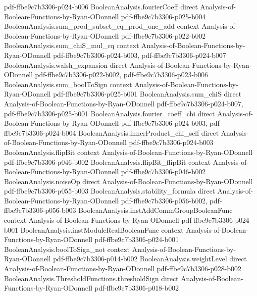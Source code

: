 \begin{lemma}
{    pdf-ffbe9c7b3306-p024-b006}
\proofstep
  {BooleanAnalysis.fourierCoeff}
  {direct}
  {Analysis-of-Boolean-Functions-by-Ryan-ODonnell}
  {pdf-ffbe9c7b3306-p025-b004}
\proofstep
  {BooleanAnalysis.sum_prod_subset_eq_prod_one_add}
  {context}
  {Analysis-of-Boolean-Functions-by-Ryan-ODonnell}
  {pdf-ffbe9c7b3306-p022-b002}
\proofstep
  {BooleanAnalysis.sum_chiS_mul_eq}
  {context}
  {Analysis-of-Boolean-Functions-by-Ryan-ODonnell}
  {pdf-ffbe9c7b3306-p024-b003,
    pdf-ffbe9c7b3306-p024-b007}
\proofstep
  {BooleanAnalysis.walsh_expansion}
  {direct}
  {Analysis-of-Boolean-Functions-by-Ryan-ODonnell}
  {pdf-ffbe9c7b3306-p022-b002,
    pdf-ffbe9c7b3306-p023-b006}
\proofstep
  {BooleanAnalysis.sum_boolToSign}
  {context}
  {Analysis-of-Boolean-Functions-by-Ryan-ODonnell}
  {pdf-ffbe9c7b3306-p025-b001}
\proofstep
  {BooleanAnalysis.sum_chiS}
  {direct}
  {Analysis-of-Boolean-Functions-by-Ryan-ODonnell}
  {pdf-ffbe9c7b3306-p024-b007,
    pdf-ffbe9c7b3306-p025-b001}
\proofstep
  {BooleanAnalysis.fourier_coeff_chi}
  {direct}
  {Analysis-of-Boolean-Functions-by-Ryan-ODonnell}
  {pdf-ffbe9c7b3306-p024-b003,
    pdf-ffbe9c7b3306-p024-b004}
\proofstep
  {BooleanAnalysis.innerProduct_chi_self}
  {direct}
  {Analysis-of-Boolean-Functions-by-Ryan-ODonnell}
  {pdf-ffbe9c7b3306-p024-b003}
\proofstep
  {BooleanAnalysis.flipBit}
  {context}
  {Analysis-of-Boolean-Functions-by-Ryan-ODonnell}
  {pdf-ffbe9c7b3306-p046-b002}
\proofstep
  {BooleanAnalysis.flipBit_flipBit}
  {context}
  {Analysis-of-Boolean-Functions-by-Ryan-ODonnell}
  {pdf-ffbe9c7b3306-p046-b002}
\proofstep
  {BooleanAnalysis.noiseOp}
  {direct}
  {Analysis-of-Boolean-Functions-by-Ryan-ODonnell}
  {pdf-ffbe9c7b3306-p055-b003}
\proofstep
  {BooleanAnalysis.stability_formula}
  {direct}
  {Analysis-of-Boolean-Functions-by-Ryan-ODonnell}
  {pdf-ffbe9c7b3306-p056-b002,
    pdf-ffbe9c7b3306-p056-b003}
\proofstep
  {BooleanAnalysis.instAddCommGroupBooleanFunc}
  {context}
  {Analysis-of-Boolean-Functions-by-Ryan-ODonnell}
  {pdf-ffbe9c7b3306-p024-b001}
\proofstep
  {BooleanAnalysis.instModuleRealBooleanFunc}
  {context}
  {Analysis-of-Boolean-Functions-by-Ryan-ODonnell}
  {pdf-ffbe9c7b3306-p024-b001}
\proofstep
  {BooleanAnalysis.boolToSign_not}
  {context}
  {Analysis-of-Boolean-Functions-by-Ryan-ODonnell}
  {pdf-ffbe9c7b3306-p014-b002}
\proofstep
  {BooleanAnalysis.weightLevel}
  {direct}
  {Analysis-of-Boolean-Functions-by-Ryan-ODonnell}
  {pdf-ffbe9c7b3306-p028-b002}
\proofstep
  {BooleanAnalysis.ThresholdFunctions.thresholdSign}
  {direct}
  {Analysis-of-Boolean-Functions-by-Ryan-ODonnell}
  {pdf-ffbe9c7b3306-p018-b002}

\end{lemma}

